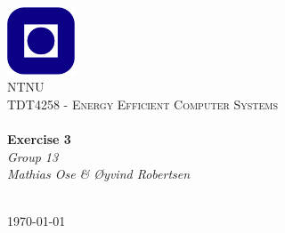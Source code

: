 \begin{titlepage}
\begin{center}
\includegraphics[width=0.15\textwidth]{img/ntnulogo.PNG}~\\[1cm]

\textsc{\LARGE NTNU}\\[1.5cm]

\textsc{\Large TDT4258 - Energy Efficient Computer Systems}\\[0.5cm]

\HRule \\[0.4cm]
{ \huge \bfseries Exercise 3}\\[0.5cm]
{\Large \textit{Group 13}}\\[0.3cm]
{\large \textit{Mathias Ose  \& \O yvind Robertsen}}\\[0.2cm]
\HRule \\[1.5cm]



\vfill

{\large \today}
\end{center}
\end{titlepage}
